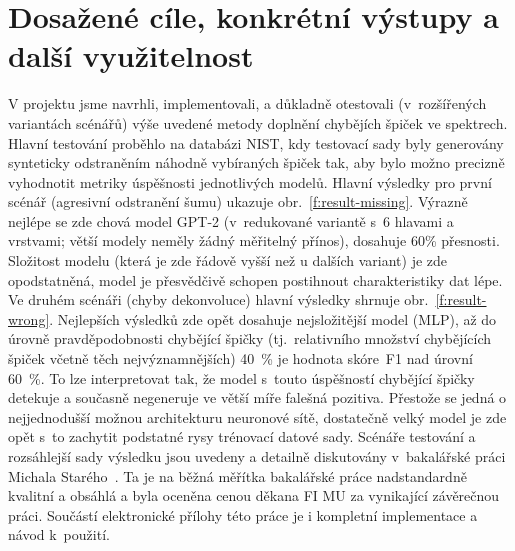 \documentclass[a4paper,11pt]{article}
\begin{document}










\section{Dosažené cíle, konkrétní výstupy a další využitelnost}
\label{cile}



V projektu jsme navrhli, implementovali, a důkladně otestovali (v~rozšířených variantách scénářů)
výše uvedené metody doplnění chybějích špiček ve spektrech.
Hlavní testování proběhlo na databázi NIST, kdy testovací sady byly generovány synteticky
odstraněním náhodně vybíraných špiček tak, aby bylo možno precizně vyhodnotit metriky 
úspěšnosti jednotlivých modelů.
Hlavní výsledky pro první scénář (agresivní odstranění šumu) ukazuje obr.~\ref{f:result-missing}.
Výrazně nejlépe se zde chová model GPT-2 (v~redukované variantě s~6 hlavami a vrstvami; větší modely neměly
žádný měřitelný přínos), dosahuje 60\% přesnosti.
Složitost modelu (která je zde řádově vyšší než u dalších variant) je zde opodstatněná,
model je přesvědčivě schopen postihnout charakteristiky dat lépe.
Ve druhém scénáři (chyby dekonvoluce) hlavní výsledky shrnuje obr.~\ref{f:result-wrong}.
Nejlepších výsledků zde opět dosahuje nejsložitější model (MLP), až do úrovně pravděpodobnosti chybějící špičky
(tj.\ relativního množství chybějících špiček včetně těch nejvýznamnějších) 40~\% je hodnota skóre~F1 nad úrovní
60~\%. To lze interpretovat tak, že model s~touto úspěšností chybějící špičky detekuje
a současně negeneruje ve větší míře falešná pozitiva.
Přestože se jedná o nejjednodušší možnou architekturu neuronové sítě, dostatečně velký model
je zde opět s~to zachytit podstatné rysy trénovací datové sady.
Scénáře testování a rozsáhlejší sady výsledku jsou uvedeny a
detailně diskutovány v~bakalářské práci Michala Starého~\cite{stary}.
Ta je na běžná měřítka bakalářské práce nadstandardně kvalitní a obsáhlá 
a byla oceněna cenou děkana FI MU za vynikající závěrečnou práci.
Součástí elektronické přílohy této práce je i kompletní implementace a návod k~použití.
\end{document}
